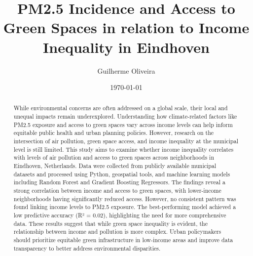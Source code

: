\documentclass[12pt, a4paper]{article}
\title{PM2.5 Incidence and Access to Green Spaces in relation to Income Inequality in Eindhoven}
\author{Guilherme Oliveira}
\date{\today}
\begin{document}
\maketitle
\begin{abstract}
    While environmental concerns are often addressed on a global scale, their local and unequal impacts remain underexplored. Understanding how climate-related factors like PM2.5 exposure and access to green spaces vary across income levels can help inform equitable public health and urban planning policies. However, research on the intersection of air pollution, green space access, and income inequality at the municipal level is still limited. This study aims to examine whether income inequality correlates with levels of air pollution and access to green spaces across neighborhoods in Eindhoven, Netherlands. Data were collected from publicly available municipal datasets and processed using Python, geospatial tools, and machine learning models including Random Forest and Gradient Boosting Regressors. The findings reveal a strong correlation between income and access to green spaces, with lower-income neighborhoods having significantly reduced access. However, no consistent pattern was found linking income levels to PM2.5 exposure. The best-performing model achieved a low predictive accuracy (R² = 0.02), highlighting the need for more comprehensive data. These results suggest that while green space inequality is evident, the relationship between income and pollution is more complex. Urban policymakers should prioritize equitable green infrastructure in low-income areas and improve data transparency to better address environmental disparities.
\end{abstract}
\end{document}
